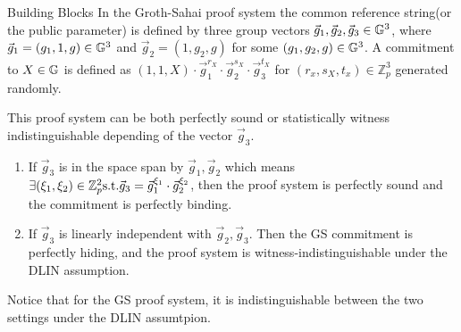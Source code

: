 \begin{subsection}{Building Blocks}
    In the Groth-Sahai proof system the common reference string(or the public parameter) is defined by three group vectors $\vec{g}_1, \vec{g}_2, \vec{g}_3 \in \mathbb{G}^3$, where $\vec{g}_1 = (g_1, 1, g) \in \mathbb{G}^3$ and $\vec{g}_2 = (1, g_2, g)$ for some $(g_1, g_2, g) \in \mathbb{G}^3$. A commitment to $X \in \mathbb{G}$ is defined as $(1, 1, X) \cdot \vec{g}_1^{r_X} \cdot \vec{g}_2^{s_X} \cdot \vec{g}_3^{t_X}$ for $(r_x, s_X, t_x) \in \mathbb{Z}_p^3$ generated randomly.

    This proof system can be both perfectly sound or statistically witness indistinguishable depending of the vector $\vec{g}_3$.
    \begin{enumerate}
    \item If $\vec{g}_3$ is in the space span by $\vec{g}_1, \vec{g}_2$ which means $\exists (\xi_1, \xi_2) \in \mathbb{Z}_p^2 \textrm{s.t.} \vec{g}_3 = \vec{g}_1^{\xi_1} \cdot \vec{g}_2^{\xi_2}$, then the proof system is perfectly sound and the commitment is perfectly binding.
    \item If $\vec{g}_3$ is linearly independent with $\vec{g}_2, \vec{g}_3$. Then the GS commitment is perfectly hiding, and the proof system is witness-indistinguishable under the DLIN assumption.
    \end{enumerate}

    Notice that for the GS proof system, it is indistinguishable between the two settings under the DLIN assumtpion. 
    

\end{subsection}












